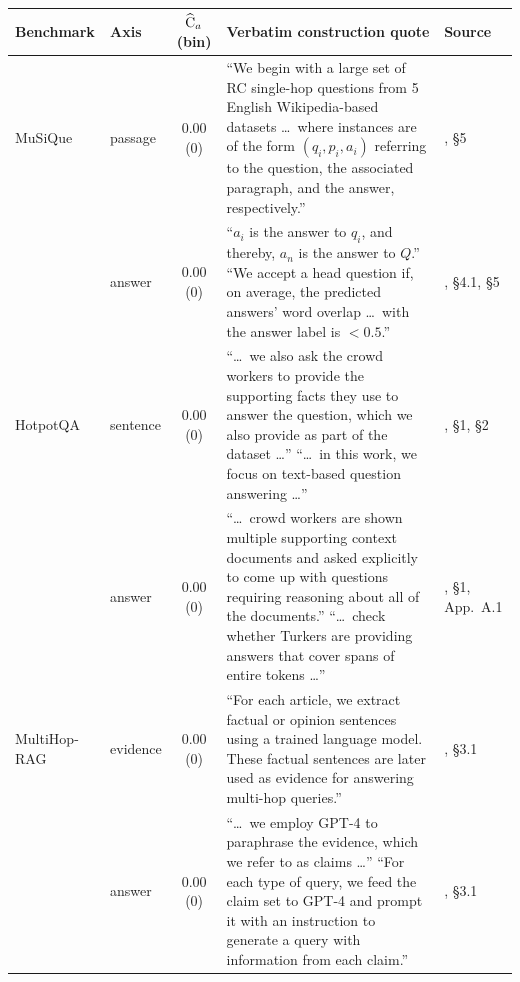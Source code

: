 
\begin{table}[p]\centering\footnotesize
\setlength{\tabcolsep}{3pt}\emergencystretch=2pt
\begin{tabular}{@{}p{}p{}cp{}p{}@{}}
\toprule
\raggedright Benchmark & Axis & $\widehat{\mathrm{C}}_a$ (bin) & Verbatim construction quote & \raggedright Source\tabularnewline
\midrule
\raggedright MuSiQue & passage & 0.00 (0) & ``We begin with a large set of RC single-hop questions from 5 English Wikipedia-based datasets \ldots\ where instances are of the form $(q_i, p_i, a_i)$ referring to the question, the associated paragraph, and the answer, respectively.'' & \raggedright \citealp{trivedi2022musique}, \S5\tabularnewline
 & answer & 0.00 (0) & ``$a_i$ is the answer to $q_i$, and thereby, $a_n$ is the answer to $Q$.'' ``We accept a head question if, on average, the predicted answers' word overlap \ldots\ with the answer label is $<0.5$.'' & \raggedright \citealp{trivedi2022musique}, \S4.1, \S5\tabularnewline
\addlinespace[1.5pt]
\raggedright HotpotQA & sentence & 0.00 (0) & ``\ldots\ we also ask the crowd workers to provide the supporting facts they use to answer the question, which we also provide as part of the dataset \ldots'' ``\ldots\ in this work, we focus on text-based question answering \ldots'' & \raggedright \citealp{yang2018hotpotqa}, \S1, \S2\tabularnewline
 & answer & 0.00 (0) & ``\ldots\ crowd workers are shown multiple supporting context documents and asked explicitly to come up with questions requiring reasoning about all of the documents.'' ``\ldots\ check whether Turkers are providing answers that cover spans of entire tokens \ldots'' & \raggedright \citealp{yang2018hotpotqa}, \S1, App.~A.1\tabularnewline
\addlinespace[1.5pt]
\raggedright MultiHop-RAG & evidence & 0.00 (0) & ``For each article, we extract factual or opinion sentences using a trained language model. These factual sentences are later used as evidence for answering multi-hop queries.'' & \raggedright \citealp{tang2024multihoprag}, \S3.1\tabularnewline
 & answer & 0.00 (0) & ``\ldots\ we employ GPT-4 to paraphrase the evidence, which we refer to as claims \ldots'' ``For each type of query, we feed the claim set to GPT-4 and prompt it with an instruction to generate a query with information from each claim.'' & \raggedright \citealp{tang2024multihoprag}, \S3.1\tabularnewline

\end{tabular}
\end{table}
